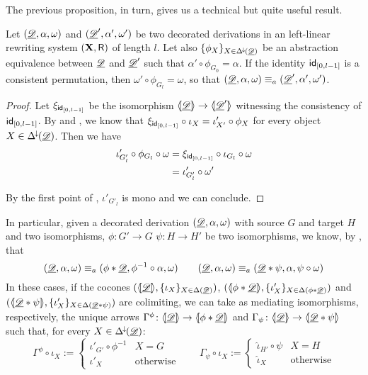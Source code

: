 The previous proposition, in turn, gives us a technical but quite useful result.

\begin{corollary}\label{cor:fromsemitocons}
			Let $(\underline{\mathscr{D}}, \alpha, \omega)$ and $(\underline{\mathscr{D}}', \alpha', \omega')$ be two decorated derivations in an left-linear rewriting system $(\textbf {\textup{X}}, \mathsf{R})$ of length $l$. Let also $\{\phi_X\}_{X\in \Delta^{\hspace{-1pt}\downarrow\hspace{-1pt}}(\underline{\mathscr{D}})}$ be an abstraction equivalence between $\underline{\mathscr{D}}$ and $\underline{\mathscr{D}}'$ such that  $\alpha'\circ \phi_{G_0}=\alpha$. If  the identity $\mathsf{id}_{[0,l-1]}$ is a consistent permutation, then $\omega'\circ \phi_{G_l}=\omega$, so that $(\underline{\mathscr{D}}, \alpha, \omega) \equiv_a (\underline{\mathscr{D}}', \alpha', \omega')$.
\end{corollary}
\begin{proof}
	Let $\xi_{\mathsf{id}_{[0, l-1]}}$ be the isomorphism $\langle \hspace{-1.85pt}[ \underline{\mathscr{D}}]\hspace{-1.85pt}\rangle\to \langle \hspace{-1.85pt}[\underline{\mathscr{D}}']\hspace{-1.85pt}\rangle$ witnessing the consistency of $\mathsf{id}_{[0, l-1]}$. By  and , we know that $\xi_{\mathsf{id}_{[0,l-1]}} \circ \iota_{X}= \iota'_{X'}\circ \phi_X$ for every object $X\in \Delta^{\hspace{-1pt}\downarrow\hspace{-1pt}}(\underline{\mathscr{D}})$. Then we have
	\begin{align*}
		\iota'_{ G'_{l}}\circ \phi_{G_l}\circ \omega&=\xi_{\mathsf{id}_{[0, l-1]}}\circ \iota_{G_l}\circ \omega\\&=\iota'_{G'_l}\circ \omega'
	\end{align*}
	
	By the first point of , $\iota'_{ G'_{l}}$ is mono and we can conclude.
\end{proof}

\begin{remark}\label{rem:abscons2}
	In particular, given a decorated derivation $(\underline{\mathscr{D}}, \alpha, \omega)$ with source $G$ and target $H$ and two isomorphisms, $\phi\colon G'\to G$ $\psi\colon H\to H'$ be two isomorphisms, we know, by , that \[(\underline{\mathscr{D}}, \alpha, \omega)\equiv_a (\phi*\underline{\mathscr{D}}, \phi^{-1}\circ \alpha, \omega ) \qquad (\underline{\mathscr{D}}, \alpha, \omega)\equiv_a (\underline{\mathscr{D}}*\psi, \alpha, \psi \circ \omega )\]
	In these cases, if the cocones $(\langle \hspace{-1.85pt}[ \underline{\mathscr{D}}]\hspace{-1.85pt}\rangle, \{\iota_X\}_{X\in \Delta(\underline{\mathscr{D}})})$, $(\langle \hspace{-1.85pt}[ \phi *\underline{\mathscr{D}} ]\hspace{-1.85pt}\rangle, \{\iota'_X\}_{X\in \Delta(\phi *\underline{\mathscr{D}})})$ and $(\langle \hspace{-1.85pt}[ \underline{\mathscr{D}}*\psi ]\hspace{-1.85pt}\rangle, \{\iota'_X\}_{X\in \Delta(\underline{\mathscr{D}}*\psi)})$ are colimiting, we can take as mediating isomorphisms, respectively, the unique arrows $\Gamma^{\phi} \colon \langle \hspace{-1.85pt}[ \underline{\mathscr{D}}]\hspace{-1.85pt}\rangle\to \langle \hspace{-1.85pt}[ \phi*\underline{\mathscr{D}} ]\hspace{-1.85pt}\rangle$ and $\Gamma_\psi\colon \langle \hspace{-1.85pt}[ \underline{\mathscr{D}}]\hspace{-1.85pt}\rangle\to \langle \hspace{-1.85pt}[ \underline{\mathscr{D}}*\psi ]\hspace{-1.85pt}\rangle$  such that, for every $X\in \Delta^{\hspace{-1pt}\downarrow\hspace{-1pt}}(\underline{\mathscr{D}})$:
	\[\Gamma^\phi \circ \iota_X:=\begin{cases}
		\iota'_{G'}\circ \phi^{-1}  & X=G\\
		\iota'_X & \text{otherwise}
	\end{cases} \qquad \Gamma_\psi \circ \iota_X:=\begin{cases}
		\hat{\iota}_{H'}\circ \psi  & X=H\\
		\hat{\iota}_X & \text{otherwise}
	\end{cases}\]
\end{remark}


